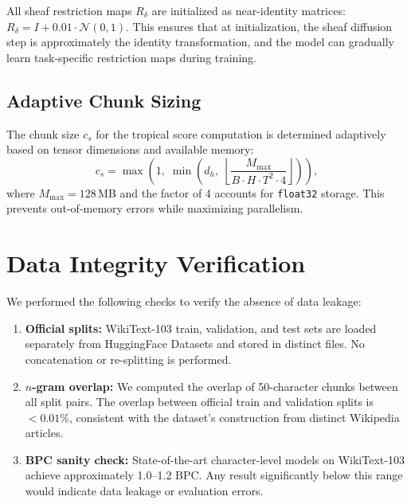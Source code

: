 \documentclass[11pt,a4paper]{article}
\begin{document}
All sheaf restriction maps $R_\delta$ are initialized as near-identity
matrices: $R_\delta = I + 0.01 \cdot \mathcal{N}(0, 1)$.  This
ensures that at initialization, the sheaf diffusion step is
approximately the identity transformation, and the model can gradually
learn task-specific restriction maps during training.

\subsection{Adaptive Chunk Sizing}

The chunk size $c_s$ for the tropical score computation is determined
adaptively based on tensor dimensions and available memory:
\begin{equation}
c_s = \max\!\left(1,\; \min\!\left(d_h,\;
  \left\lfloor \frac{M_{\max}}{B \cdot H \cdot T^2 \cdot 4}
  \right\rfloor\right)\right),
\end{equation}
where $M_{\max} = 128$\,MB and the factor of 4 accounts for
\texttt{float32} storage.  This prevents out-of-memory errors while
maximizing parallelism.


\section{Data Integrity Verification}
\label{sec:data_integrity}

We performed the following checks to verify the absence of data
leakage:

\begin{enumerate}[leftmargin=*,nosep]
\item \textbf{Official splits:} WikiText-103 train, validation, and
  test sets are loaded separately from HuggingFace Datasets and stored
  in distinct files.  No concatenation or re-splitting is performed.
\item \textbf{$n$-gram overlap:} We computed the overlap of
  50-character chunks between all split pairs.  The overlap between
  official train and validation splits is $< 0.01\%$, consistent with
  the dataset's construction from distinct Wikipedia articles.
\item \textbf{BPC sanity check:} State-of-the-art character-level
  models on WikiText-103 achieve approximately 1.0--1.2 BPC.  Any
  result significantly below this range would indicate data leakage or
  evaluation errors.
\end{enumerate}
\end{document}

